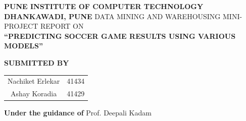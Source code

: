 \documentclass[a4paper, 12pt]{article}
\begin{document}
 
\begin{titlepage}
    \begin{center}
        \vspace*{1cm}
        
        \large
                \textbf{\MakeUppercase{Pune Institute of Computer Technology}}
                \linebreak
        \textbf{\MakeUppercase{Dhankawadi, Pune}}
        \vspace{0.5cm}
                        \linebreak
                        \linebreak
        \MakeUppercase{DATA MINING AND WAREHOUSING  Mini-Project REPORT }
        \linebreak
        ON
        \linebreak
        \vspace{0.5cm}
        \large
        \\
        \textbf{\MakeUppercase{“Predicting Soccer Game Results using various models”}}
        \linebreak
        
        \textbf{SUBMITTED BY}
        \vspace{1cm}
        
        \begin{center}
        \begin{tabular}{ c c }
         Nachiket Erlekar & 41434 \\ 
         Ashay Koradia & 41429 
        \end{tabular}
        \end{center}
                
        \textbf{\large{Under the guidance of}}
        \linebreak
        Prof. Deepali Kadam
        \linebreak
        
        
        
        \vspace{0.8cm}
        


\end{center}
\end{titlepage}
\end{document}
